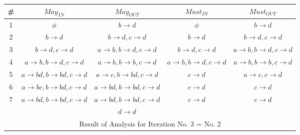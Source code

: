 \documentclass[12pt]{article}
\begin{document}
\begin{enumerate}
{\begin{center}
  \renewcommand{\arraystretch}{1.3}
  \hspace*{-25mm}\begin{tabular}{|c||c|c||c|c|} \hline
    {\bf \#} & {\bf $May_{IN}$} & {\bf $May_{OUT}$} & {\bf
      $Must_{IN}$} & {\bf $Must_{OUT}$}  \\ \hline \hline
    1 & $\phi$ & $b\rightarrow d$& $\phi$ & $b\rightarrow
    d$\\ \hline
    2 & $b\rightarrow d$ & $b\rightarrow d, c \rightarrow d$ & $b\rightarrow
    d$ & $b\rightarrow d, c \rightarrow d$ \\ \hline
    3 & $b\rightarrow d, c \rightarrow d$ & $a
   \rightarrow b, b\rightarrow d,
    c \rightarrow d$ & $b\rightarrow d, c \rightarrow d$ & $a
   \rightarrow b, b\rightarrow d, c \rightarrow d$ \\ \hline
    4 & $a \rightarrow b, b\rightarrow d,
    c \rightarrow d$ & $a \rightarrow b, b\rightarrow b,
    c \rightarrow d$ & $a \rightarrow b, b\rightarrow d,
    c \rightarrow d$ & $a \rightarrow b, b\rightarrow b,
    c \rightarrow d$ \\ \hline
    5 & ${a \rightarrow b d, b\rightarrow b d,
    c \rightarrow d}$ & ${a \rightarrow c, b\rightarrow b d,
    c \rightarrow d}$ & ${c \rightarrow d}$ &${a \rightarrow c, c
    \rightarrow d}$  \\ \hline 
    6 & $a \rightarrow b c, b\rightarrow b d,
    c \rightarrow d$ & $a \rightarrow b d, b\rightarrow b d,
    c \rightarrow d$ & $c \rightarrow d$ & $c \rightarrow d$ \\ \hline
    7 & $a \rightarrow b d, b\rightarrow b d,
    c \rightarrow d$ & $a \rightarrow b d, b\rightarrow b d,
    c \rightarrow d $ & $c \rightarrow d$ & $c \rightarrow d$\\
    & & $d \rightarrow d$ & &  \\ \hline
    \multicolumn{5}{c}{  Result of Analysis for Iteration
      No. 3 = No. 2}
  \end{tabular}
\end{center}
}
\clearpage
\end{enumerate}
\end{document}
